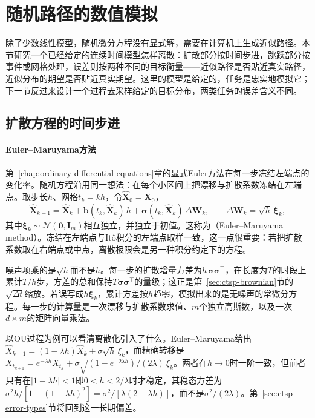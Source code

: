 \section{随机路径的数值模拟}
\label{sec:ctsp-numerical}

除了少数线性模型，随机微分方程没有显式解，需要在计算机上生成近似路径。本节研究一个已经给定的连续时间模型怎样离散：扩散部分按时间步进，跳跃部分按事件或网格处理，误差则按两种不同的目标衡量——近似路径是否贴近真实路径，近似分布的期望是否贴近真实期望。这里的模型是给定的，任务是忠实地模拟它；下一节反过来设计一个过程去采样给定的目标分布，两类任务的误差含义不同。

\subsection{扩散方程的时间步进}
\label{sec:ctsp-time-stepping}

\paragraph{Euler--Maruyama方法}
第~\ref{chap:ordinary-differential-equations}章的显式Euler方法在每一步冻结左端点的变化率。随机方程沿用同一想法：在每个小区间上把漂移与扩散系数冻结在左端点。取步长$h$、网格$t_k=kh$，令$\widehat{\bm X}_0=\bm X_0$，
\begin{equation}
  \widehat{\bm X}_{k+1}=\widehat{\bm X}_k+\bm b(t_k,\widehat{\bm X}_k)\,h+\bm\sigma(t_k,\widehat{\bm X}_k)\,\Delta\bm W_k,\qquad\Delta\bm W_k=\sqrt h\,\bm\xi_k ,
  \label{eq:ctsp-euler-maruyama}
\end{equation}
其中$\bm\xi_k\sim\mathcal N(\bm0,\bm I_m)$相互独立，并独立于初值。这称为（Euler--Maruyama method）。冻结在左端点与Itô积分的左端点取样一致，这一点很重要：若把扩散系数取在右端点或中点，离散极限会是另一种积分约定下的方程。

噪声项乘的是$\sqrt h$而不是$h$。每一步的扩散增量方差为$h\,\bm\sigma\bm\sigma^\top$，在长度为$T$的时段上累计$T/h$步，方差的总和保持$T\bm\sigma\bm\sigma^\top$的量级；这正是第~\ref{sec:ctsp-brownian}节的$\sqrt{\Delta t}$缩放。若误写成$h\bm\xi_k$，累计方差按$h$趋零，模拟出来的是无噪声的常微分方程。每一步的计算量是一次漂移与扩散系数求值、$m$个独立高斯数，以及一次$d\times m$的矩阵向量乘法。

以OU过程为例可以看清离散化引入了什么。Euler--Maruyama给出$\widehat X_{k+1}=(1-\lambda h)\widehat X_k+\sigma\sqrt h\,\xi_k$，而精确转移是$X_{t_{k+1}}=e^{-\lambda h}X_{t_k}+\sigma\sqrt{(1-e^{-2\lambda h})/(2\lambda)}\,\xi_k$。两者在$h\to0$时一阶一致，但前者只有在$|1-\lambda h|<1$即$0<h<2/\lambda$时才稳定，其稳态方差为$\sigma^2h/[1-(1-\lambda h)^2]=\sigma^2/[\lambda(2-\lambda h)]$，而不是$\sigma^2/(2\lambda)$。第~\ref{sec:ctsp-error-types}节将回到这一长期偏差。

